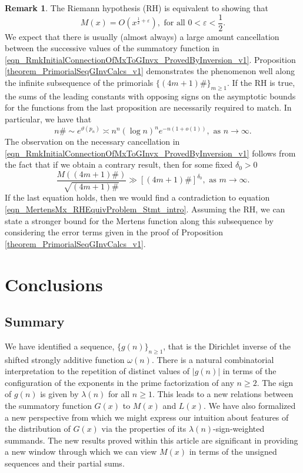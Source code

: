 \documentclass[11pt,reqno,a4letter]{article}
\newcommand{\hlocalref}[1]{\hyperref[#1]{\ref{#1}}}
\numberwithin{equation}{section}
\numberwithin{figure}{section}
\numberwithin{table}{section}
\theoremstyle{plain}
\numberwithin{theorem}{section}
\theoremstyle{definition}
\newtheorem{remark}[theorem]{Remark}
\begin{document}
\begin{remark}
\label{remark_LocalCancellationWithGxAlongThePrimorialsUnderTheRH} 
The Riemann hypothesis (RH) is equivalent to showing that 
\begin{equation} 
\label{eqn_MertensMx_RHEquivProblem_Stmt_intro} 
M(x) = O\left(x^{\frac{1}{2}+\varepsilon}\right), \text{ for all } 0 < \varepsilon < \frac{1}{2}.
\end{equation}
We expect that there is usually (almost always) 
a large amount cancellation between the successive 
values of the summatory function in 
\eqref{eqn_RmkInitialConnectionOfMxToGInvx_ProvedByInversion_v1}. 
Proposition \hlocalref{theorem_PrimorialSeqGInvCalcs_v1} 
demonstrates the phenomenon well along the infinite 
subsequence of the primorials $\{(4m+1)\#\}_{m \geq 1}$. 
If the RH is true, the sums of the leading constants with opposing signs 
on the asymptotic bounds for the functions from the last proposition 
are necessarily required to match. 
In particular, we have that 
\cite{DUSART-1999,DUSART-2010} 
\[
n\# \sim e^{\vartheta(p_n)} \asymp n^n (\log n)^n e^{-n(1+o(1))}, 
     \text{ as } n \rightarrow \infty. 
\]
The observation on the necessary cancellation in 
\eqref{eqn_RmkInitialConnectionOfMxToGInvx_ProvedByInversion_v1}
follows from the fact that if we obtain a contrary result, 
then for some fixed $\delta_0 > 0$
\[
\frac{M((4m+1)\#)}{\sqrt{(4m+1)\#}} \gg \left[(4m+1)\#\right]^{\delta_0}, 
     \text{ as } m \rightarrow \infty. 
\]
If the last equation holds, then we would find a contradiction to 
equation \eqref{eqn_MertensMx_RHEquivProblem_Stmt_intro}. 
Assuming the RH, we can state a stronger bound for the 
Mertens function along this subsequence by considering the 
error terms given in the proof of 
Proposition \hlocalref{theorem_PrimorialSeqGInvCalcs_v1}. 
\end{remark}

\section{Conclusions}

\subsection{Summary}

We have identified a sequence, 
$\{g(n)\}_{n \geq 1}$, that is the Dirichlet inverse of the 
shifted strongly additive function $\omega(n)$. 
There is a natural 
combinatorial interpretation to the repetition of distinct values 
of $|g(n)|$ in terms of the configuration of the 
exponents in the prime factorization of any $n \geq 2$. 
The sign of $g(n)$ is given by $\lambda(n)$ for all $n \geq 1$. 
This leads to a new relations between the 
summatory function $G(x)$ to $M(x)$ and $L(x)$. 
We have also formalized a new perspective from which we might express 
our intuition about features of the distribution of $G(x)$ 
via the properties of its $\lambda(n)$-sign-weighted summands.
The new results proved within this article 
are significant in providing a new window through which we can view $M(x)$ 
in terms of the unsigned sequences and their partial sums. 
\end{document}

